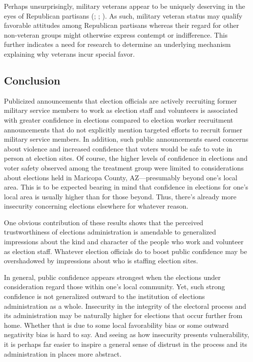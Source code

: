 \documentclass[
  12pt,
  letterpaper,
]{article}
\begin{document}
Perhaps unsurprisingly, military veterans appear to be uniquely
deserving in the eyes of Republican partisans
(;
;
). As such, military veteran
status may qualify favorable attitudes among Republican partisans
whereas their regard for other non-veteran groups might otherwise
express contempt or indifference. This further indicates a need for
research to determine an underlying mechanism explaining why veterans
incur special favor.

\subsection{Conclusion}\label{conclusion}

Publicized announcements that election officials are actively recruiting
former military service members to work as election staff and volunteers
is associated with greater confidence in elections compared to election
worker recruitment announcements that do not explicitly mention targeted
efforts to recruit former military service members. In addition, such
public announcements eased concerns about violence and increased
confidence that voters would be safe to vote in person at election
sites. Of course, the higher levels of confidence in elections and voter
safety observed among the treatment group were limited to considerations
about elections held in Maricopa County, AZ---presumably beyond one's
local area. This is to be expected bearing in mind that confidence in
elections for one's local area is usually higher than for those beyond.
Thus, there's already more insecurity concerning elections elsewhere for
whatever reason.

One obvious contribution of these results shows that the perceived
trustworthiness of elections administration is amendable to generalized
impressions about the kind and character of the people who work and
volunteer as election staff. Whatever election officials do to boost
public confidence may be overshadowed by impressions about who is
staffing election sites.

In general, public confidence appears strongest when the elections under
consideration regard those within one's local community. Yet, such
strong confidence is not generalized outward to the institution of
elections administration as a whole. Insecurity in the integrity of the
electoral process and its administration may be naturally higher for
elections that occur further from home. Whether that is due to some
local favorability bias or some outward negativity bias is hard to say.
And seeing as how insecurity presents vulnerability, it is perhaps far
easier to inspire a general sense of distrust in the process and its
administration in places more abstract.
\end{document}
